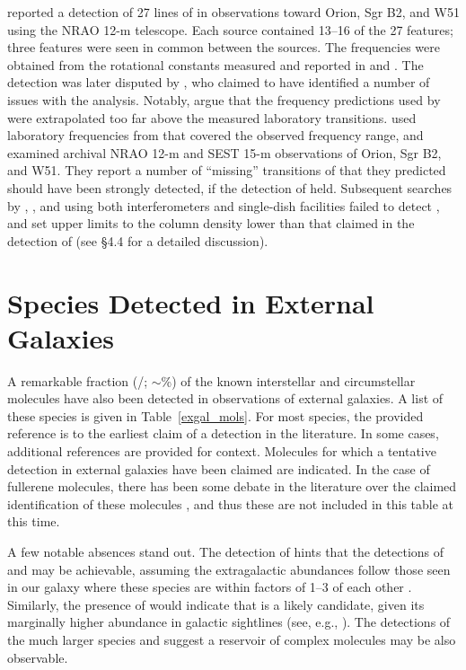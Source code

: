 \documentclass[twocolumn]{aastex631}
\newcommand{\update}[1]{{#1}}
\newcommand{\nmols}{}
\newcommand{\nexgal}{}
\newcommand{\nexgalpercent}{}
\begin{document}
    \citet{Kuan:2003yt} reported a detection of 27 lines of  in observations toward Orion, Sgr B2, and W51 using the NRAO 12-m telescope.  Each source contained 13--16 of the 27 features; three features were seen in common between the sources.  The frequencies were obtained from the rotational constants measured and reported in \citet{Suenram:1980cs} and \citet{Lovas:1995it}.  The detection was later disputed by \citet{Snyder:2005tr}, who claimed to have identified a number of issues with the analysis.  Notably, \citet{Snyder:2005tr} argue that the frequency predictions used by \citet{Kuan:2003yt} were extrapolated too far above the measured laboratory transitions.  \citet{Snyder:2005tr} used laboratory frequencies from \citet{Ilyushin:2005iu} that covered the observed frequency range, and examined archival NRAO 12-m and SEST 15-m observations of Orion, Sgr B2, and W51.  They report a number of ``missing'' transitions of  that they predicted should have been strongly detected, if the detection of \citet{Kuan:2003yt} held.  Subsequent searches by \citet{Jones:2007fa}, \citet{Cunningham:2007kl}, and \citet{Belloche:2008jy} using both interferometers and single-dish facilities failed to detect , and set upper limits to the column density lower than that claimed in the detection of \citet{Kuan:2003yt} (see \citealt{Belloche:2008jy} \S4.4 for a detailed discussion).
    
\section{Species Detected in External Galaxies}
\label{exgals}

A remarkable fraction \update{(\nexgal/\nmols; $\sim$\nexgalpercent\%)}  of the known interstellar and circumstellar molecules have also been detected in observations of external galaxies.  A list of these species is given in Table~\ref{exgal_mols}.  For most species, the provided reference is to the earliest claim of a detection in the literature.  In some cases, additional references are provided for context.  Molecules for which a tentative detection in external galaxies have been claimed are indicated.  In the case of fullerene molecules, there has been some debate in the literature over the claimed identification of these molecules  \citep{Duley:2012dv}, and thus these are not included in this table at this time.  

A few notable absences stand out.  The detection of  \citep{Muller:2014je} hints that the detections of  and  may be achievable, assuming the extragalactic abundances follow those seen in our galaxy where these species are within factors of 1--3 of each other \citep{Monje:2013fk}.  Similarly, the presence of  would indicate that  is a likely candidate, given its marginally higher abundance in galactic sightlines (see, e.g., \citealt{Neufeld:2012gz}).  The detections of the much larger species  and  \citep{Qiu:2018gd,Sewiio:2018jx} suggest a reservoir of complex molecules may be also observable.
\end{document}
